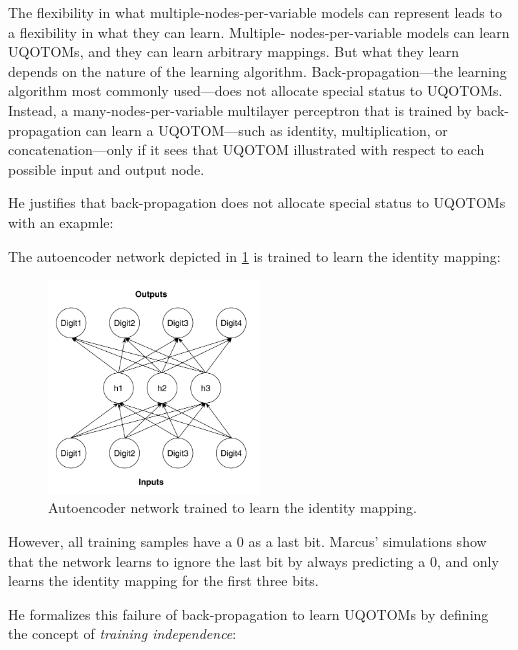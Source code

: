 \documentclass[../../main.tex]{subfiles}
\begin{document}
\begin{citecallout}
    The flexibility in what multiple-nodes-per-variable models
    can represent leads to a flexibility in what they can learn. Multiple-
    nodes-per-variable models can learn UQOTOMs, and they can learn
    arbitrary mappings. But what they learn depends on the nature of the
    learning algorithm. Back-propagation—the learning algorithm most
    commonly used—does not allocate special status to UQOTOMs. Instead, a many-nodes-per-variable multilayer perceptron that is trained
    by back-propagation can learn a UQOTOM—such as identity, multiplication, or concatenation—only if it sees that UQOTOM illustrated with
    respect to each possible input and output node.
\end{citecallout}

He justifies that back-propagation does not allocate special status to UQOTOMs with an exapmle:

\begin{example}
    The autoencoder network depicted in \ref{fig:identity_autoencoder} is trained to learn the identity mapping:

    \begin{figure}[H]
        \centering
        \includegraphics[width=0.5\textwidth]{chapters/relations_between_variables/network.png}
        \caption{Autoencoder network trained to learn the identity mapping.}
        \label{fig:identity_autoencoder}
    \end{figure}

    However, all training samples have a 0 as a last bit. Marcus' simulations show that the network learns to ignore the last bit by always predicting a 0, and only learns the identity mapping for the first three bits.
\end{example}

He formalizes this failure of back-propagation to learn UQOTOMs by defining the concept of \emph{training independence}:
\end{document}
